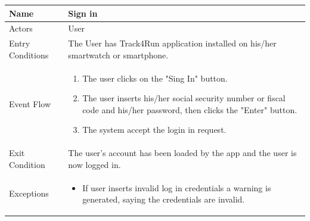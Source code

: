 \begin{enumerate}
\FloatBarrier
\begin{table}[h]
\begin{tabular}{|l|p{}|}
\hline
Name             & Sign in \\ \hline
Actors           & User  \\ \hline
Entry Conditions & The User has Track4Run application installed on his/her smartwatch or smartphone.    \\ \hline
Event Flow       & \begin{enumerate}
            \item The user clicks on the "Sing In" button.
            \item The user inserts his/her social security number or fiscal code and his/her password, then clicks the "Enter" button.
            \item The system accept the login in request.
        \end{enumerate}\\ \hline
Exit Condition   & The user's account has been loaded by the app and the user is now logged in.\\ \hline
Exceptions       & \begin{itemize}
\item If user inserts invalid log in credentials a warning is generated, saying the credentials are invalid.
\end{itemize}\\ \hline
\end{tabular}
\end{table}
\FloatBarrier


\end{enumerate}
